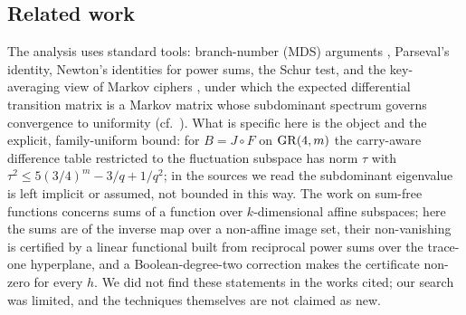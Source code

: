 \subsection{Related work}
The analysis uses standard tools: branch-number (MDS) arguments \cite{Hong,Park}, Parseval's identity, Newton's identities
for power sums, the Schur test, and the key-averaging view of Markov ciphers \cite{LMM}, under which the expected
differential transition matrix is a Markov matrix whose subdominant spectrum governs convergence to uniformity
(cf.\ \cite{BV}). What is specific here is the object and the explicit, family-uniform bound: for $B=J\circ F$ on $\mathrm{GR}(4,m)$ the
carry-aware difference table restricted to the fluctuation subspace has norm $\tau$ with $\tau^2\le5(3/4)^m-3/q+1/q^2$; in the
sources we read the subdominant eigenvalue is left implicit or assumed, not bounded in this way. The work on sum-free
functions \cite{EHRZ,HZ} concerns sums of a function over $k$-dimensional affine subspaces; here the sums are of the inverse
map over a non-affine image set, their non-vanishing is certified by a linear functional built from reciprocal power sums
over the trace-one hyperplane, and a Boolean-degree-two correction makes the certificate non-zero for every $h$. We did not
find these statements in the works cited; our search was limited, and the techniques themselves are not claimed as new.
